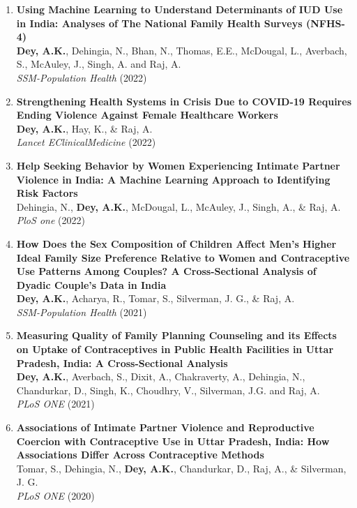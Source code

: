 \documentclass[13pt,letterpaper]{article}
\begin{document}
\begin{enumerate}
\item \textbf{Using Machine Learning to Understand Determinants of IUD Use in India: Analyses of The National Family Health Surveys (NFHS-4)}\\
\textbf{Dey, A.K.}, Dehingia, N., Bhan, N., Thomas, E.E., McDougal, L., Averbach, S., McAuley, J., Singh, A. and Raj, A.\\
\emph{SSM-Population Health} (2022) 

\item \textbf{Strengthening Health Systems in Crisis Due to COVID-19 Requires Ending Violence Against Female Healthcare Workers}\\
\textbf{Dey, A.K.}, Hay, K., \& Raj, A.\\
\emph{Lancet EClinicalMedicine} (2022) 

\item \textbf{Help Seeking Behavior by Women Experiencing Intimate Partner Violence in India: A Machine Learning Approach to Identifying Risk Factors}\\
Dehingia, N., \textbf{Dey, A.K.}, McDougal, L., McAuley, J., Singh, A., \& Raj, A.\\
\emph{PloS one} (2022)   

\item \textbf{How Does the Sex Composition of Children Affect Men's Higher Ideal Family Size Preference Relative to Women and Contraceptive Use Patterns Among Couples? A Cross-Sectional Analysis of Dyadic Couple's Data in India}\\
\textbf{Dey, A.K.}, Acharya, R., Tomar, S., Silverman, J. G., \& Raj, A.\\
\emph{SSM-Population Health} (2021) 

\item \textbf{Measuring Quality of Family Planning Counseling and its Effects on Uptake of Contraceptives in Public Health Facilities in Uttar Pradesh, India: A Cross-Sectional Analysis}\\
\textbf{Dey, A.K.}, Averbach, S., Dixit, A., Chakraverty, A., Dehingia, N., Chandurkar, D., Singh, K., Choudhry, V., Silverman, J.G. and Raj, A.\\
\emph{PLoS ONE} (2021)  

\item \textbf{Associations of Intimate Partner Violence and Reproductive Coercion with Contraceptive Use in Uttar Pradesh, India: How Associations Differ Across Contraceptive Methods}\\
Tomar, S., Dehingia, N., \textbf{Dey, A.K.}, Chandurkar, D., Raj, A., \& Silverman, J. G.\\
\emph{PLoS ONE} (2020) 


\end{enumerate}
\end{document}

